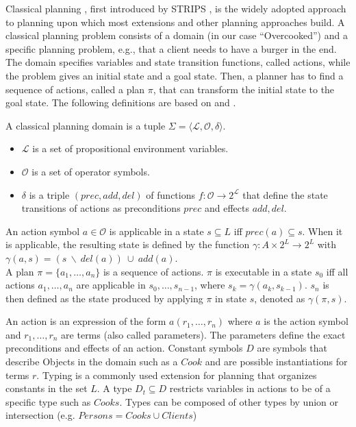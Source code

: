 Classical planning \citep{ghallabAutomatedPlanningTheory2004}, first introduced by STRIPS \citep{fikesSTRIPSNewApproach1971}, is the widely adopted approach to planning upon which most extensions and other planning approaches build.
A classical planning problem consists of a domain (in our case ``Overcooked'') and a specific planning problem, e.g., that a client needs to have a burger in the end.
The domain specifies variables and state transition functions, called actions, while the problem gives an initial state and a goal state.
Then, a planner has to find a sequence of actions, called a plan $\pi$, that can transform the initial state to the goal state.
The following definitions are based on \cite{ghallabAutomatedPlanningTheory2004} and \cite{hollerGuidingSearchHTN2019}.

\begin{definition}
  A classical planning domain is a tuple $\Sigma=\langle \mathcal{L}, \mathcal{O}, \delta \rangle$.
  \begin{itemize}
    \item $\mathcal{L}$ is a set of propositional environment variables. 
    \item $\mathcal{O}$ is a set of operator symbols.
    \item $\delta$ is a triple $(prec, add, del )$ of functions $f: \mathcal{O} \rightarrow 2^\mathcal{L}$ that define the state transitions of actions as preconditions $prec$ and effects $add, del$.
  \end{itemize}
  An action symbol $a \in \mathcal{O}$ is applicable in a state $s \subseteq L$ iff $prec(a) \subseteq s$.
  When it is applicable, the resulting state is defined by the function $\gamma: A \times 2^L \rightarrow 2^L$ with $\gamma(a,s) = (s~\backslash~del(a))~\cup~add(a)$. \\
  A plan $\pi = \{a_1,\dots,a_n\}$ is a sequence of actions.
  $\pi$ is executable in a state $s_0$ iff all actions $a_1,\dots,a_n$ are applicable in $s_0,\dots,s_{n-1}$, where $s_k=\gamma(a_k,s_{k-1})$.
  $s_n$ is then defined as the state produced by applying $\pi$ in state $s$, denoted as $\gamma(\pi,s)$.
\end{definition}

An action is an expression of the form $a(r_1,\dots,r_n)$ where $a$ is the action symbol and $r_1,\dots,r_n$ are terms (also called parameters).
The parameters define the exact preconditions and effects of an action.
Constant symbols $D$ are symbols that describe Objects in the domain such as a $Cook$ and are possible instantiations for terms $r$.
Typing is a commonly used extension for planning that organizes constants in the set $L$.
A type $D_t \subseteq D$ restricts variables in actions to be of a specific type such as $Cooks$.
Types can be composed of other types by union or intersection (e.g. $Persons=Cooks\cup Clients$)

